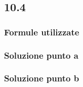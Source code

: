 \documentclass[../../main.tex]{subfiles}
\begin{document}
\subsection*{10.4}
\subsubsection*{Formule utilizzate}
\subsubsection*{Soluzione punto a}
\subsubsection*{Soluzione punto b}
\newpage
\end{document}
